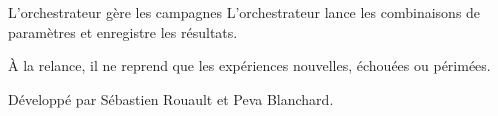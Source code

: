 \begin{frame}{L'orchestrateur gère les campagnes}
    L'orchestrateur lance les combinaisons de paramètres et enregistre les résultats.

    À la relance, il ne reprend que les expériences nouvelles, échouées ou périmées.

    \medskip
    Développé par Sébastien Rouault et Peva Blanchard.
\end{frame}
